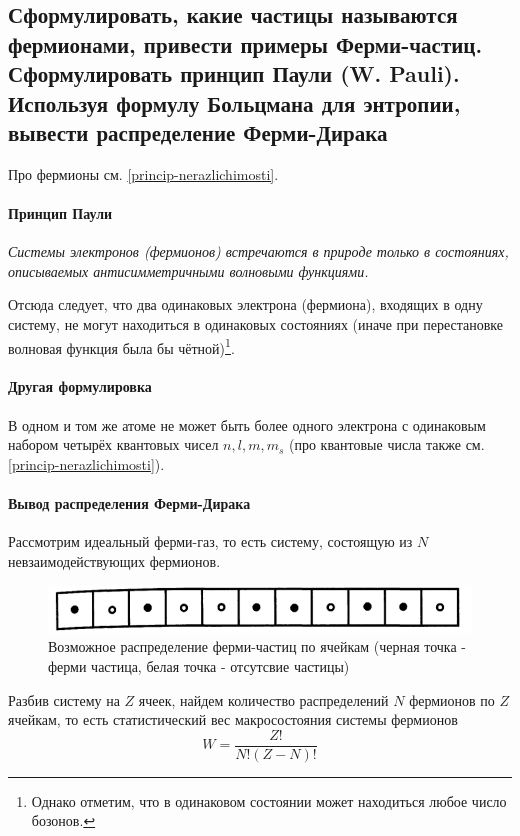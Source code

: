 \subsection{Сформулировать, какие частицы называются фермионами, привести примеры Ферми-частиц.
Сформулировать принцип Паули (W. Pauli). Используя формулу Больцмана для энтропии, вывести
распределение Ферми-Дирака} \label{fermi-dirak}

Про фермионы см. \ref{princip-nerazlichimosti}.

\paragraph{Принцип Паули}
\textit{Системы электронов (фермионов) встречаются в природе только в состояниях, описываемых антисимметричными волновыми функциями. }

Отсюда следует, что два одинаковых электрона (фермиона), входящих в одну систему, не могут находиться в одинаковых состояниях (иначе при перестановке волновая функция была бы чётной)\footnote{Однако отметим, что в одинаковом состоянии может находиться любое число бозонов.}.

\paragraph{Другая формулировка} В одном и том же атоме не может быть более одного электрона с одинаковым набором четырёх квантовых чисел $n, l , m, m_s$ (про квантовые числа также см. \ref{princip-nerazlichimosti}).

\paragraph{Вывод распределения Ферми-Дирака}
Рассмотрим идеальный ферми-газ, то есть систему, состоящую из $N$ невзаимодействующих фермионов.
\begin{figure}[H]
	\centering
	\includegraphics[width=0.7\linewidth]{img/write-05/yacheiki}
	\caption{Возможное распределение ферми-частиц по ячейкам (черная точка - ферми частица, белая точка - отсутсвие частицы)}
	\label{fig:yacheiki}
\end{figure}
Разбив систему на $Z$ ячеек, найдем количество распределений $N$ фермионов по $Z$ ячейкам, то есть статистический вес макросостояния системы фермионов
\begin{equation*}
	W = \frac{Z!}{N!(Z-N)!}
\end{equation*}

